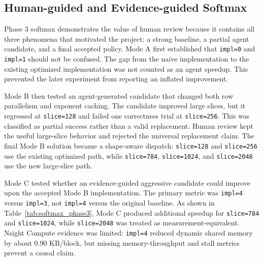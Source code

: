 \documentclass[conference]{IEEEtran}
\begin{document}
\subsection{Human-guided and Evidence-guided Softmax}

Phase 3 softmax demonstrates the value of human review because it contains all three phenomena that motivated the project: a strong baseline, a partial agent candidate, and a final accepted policy. Mode A first established that \texttt{impl=0} and \texttt{impl=1} should not be confused. The gap from the naive implementation to the existing optimized implementation was not counted as an agent speedup. This prevented the later experiment from reporting an inflated improvement.

Mode B then tested an agent-generated candidate that changed both row parallelism and exponent caching. The candidate improved large slices, but it regressed at \texttt{slice=128} and failed one correctness trial at \texttt{slice=256}. This was classified as partial success rather than a valid replacement. Human review kept the useful large-slice behavior and rejected the universal replacement claim. The final Mode B solution became a shape-aware dispatch: \texttt{slice=128} and \texttt{slice=256} use the existing optimized path, while \texttt{slice=784}, \texttt{slice=1024}, and \texttt{slice=2048} use the new large-slice path.

Mode C tested whether an evidence-guided aggressive candidate could improve upon the accepted Mode B implementation. The primary metric was \texttt{impl=4} versus \texttt{impl=3}, not \texttt{impl=4} versus the original baseline. As shown in Table~\ref{tab:softmax_phase3}, Mode C produced additional speedup for \texttt{slice=784} and \texttt{slice=1024}, while \texttt{slice=2048} was treated as measurement-equivalent. Nsight Compute evidence was limited: \texttt{impl=4} reduced dynamic shared memory by about 0.90 KB/block, but missing memory-throughput and stall metrics prevent a causal claim.

\begin{table}[t]
\centering
\caption{Softmax Phase 3 final interpretation. Mode B compares against \texttt{impl=1}; Mode C compares against accepted \texttt{impl=3}.}
\label{tab:softmax_phase3}
\footnotesize
{}
\end{table}
\end{document}
